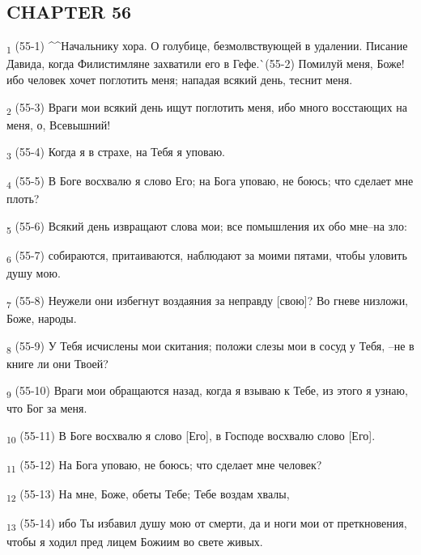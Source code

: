 \subsection{CHAPTER 56}
\begin{tcolorbox}
\textsubscript{1} (55-1) ^^Начальнику хора. О голубице, безмолвствующей в удалении. Писание Давида, когда Филистимляне захватили его в Гефе.^^ (55-2) Помилуй меня, Боже! ибо человек хочет поглотить меня; нападая всякий день, теснит меня.
\end{tcolorbox}
\begin{tcolorbox}
\textsubscript{2} (55-3) Враги мои всякий день ищут поглотить меня, ибо много восстающих на меня, о, Всевышний!
\end{tcolorbox}
\begin{tcolorbox}
\textsubscript{3} (55-4) Когда я в страхе, на Тебя я уповаю.
\end{tcolorbox}
\begin{tcolorbox}
\textsubscript{4} (55-5) В Боге восхвалю я слово Его; на Бога уповаю, не боюсь; что сделает мне плоть?
\end{tcolorbox}
\begin{tcolorbox}
\textsubscript{5} (55-6) Всякий день извращают слова мои; все помышления их обо мне--на зло:
\end{tcolorbox}
\begin{tcolorbox}
\textsubscript{6} (55-7) собираются, притаиваются, наблюдают за моими пятами, чтобы уловить душу мою.
\end{tcolorbox}
\begin{tcolorbox}
\textsubscript{7} (55-8) Неужели они избегнут воздаяния за неправду [свою]? Во гневе низложи, Боже, народы.
\end{tcolorbox}
\begin{tcolorbox}
\textsubscript{8} (55-9) У Тебя исчислены мои скитания; положи слезы мои в сосуд у Тебя, --не в книге ли они Твоей?
\end{tcolorbox}
\begin{tcolorbox}
\textsubscript{9} (55-10) Враги мои обращаются назад, когда я взываю к Тебе, из этого я узнаю, что Бог за меня.
\end{tcolorbox}
\begin{tcolorbox}
\textsubscript{10} (55-11) В Боге восхвалю я слово [Его], в Господе восхвалю слово [Его].
\end{tcolorbox}
\begin{tcolorbox}
\textsubscript{11} (55-12) На Бога уповаю, не боюсь; что сделает мне человек?
\end{tcolorbox}
\begin{tcolorbox}
\textsubscript{12} (55-13) На мне, Боже, обеты Тебе; Тебе воздам хвалы,
\end{tcolorbox}
\begin{tcolorbox}
\textsubscript{13} (55-14) ибо Ты избавил душу мою от смерти, да и ноги мои от преткновения, чтобы я ходил пред лицем Божиим во свете живых.
\end{tcolorbox}
